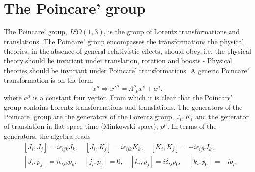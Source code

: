 \section{The Poincare' group}
The Poincare' group, $ISO(1,3)$, is the group of Lorentz transformations and translations. The Poincare' group encompasses the transformations the physical theories, in the absence of general relativistic effects, should obey, i.e. the physical theory should be invariant under translation, rotation and boosts - Physical theories should be invariant under Poincare' transformations. A generic Poincare' transformation is on the form
\begin{equation}
	x^\mu\Rightarrow {x'}^\mu=\Lambda^{\mu}_{\,\,\, \nu}x^\nu+a^{\mu}.
\end{equation}  
where $a^\mu$ is a constant four vector. From which it is clear that the Poincare' group contains Lorentz transformations and translations. The generators of the Poincare' group are the generators of the Lorentz group, $J_i,K_i$ and the generator of translation in flat space-time (Minkowski space); $p^\mu$. In terms of the generators, the algebra reads
\begin{equation}
	\begin{split}
		&[J_i,J_j]=i\epsilon_{ijk}J_k, \quad [J_i,K_j]=i \epsilon_{ijk}K_k, \quad [K_i,K_j]=-i\epsilon_{ijk}J_k,\\
		&[J_i,p_j]=i\epsilon_{ijk}p_k,\quad [j_i,p_0]=0,\quad [k_i,p_j]=i\delta_{ij}p_0,\quad [k_i,p_0]=-ip_i.
	\end{split}
\end{equation} 
